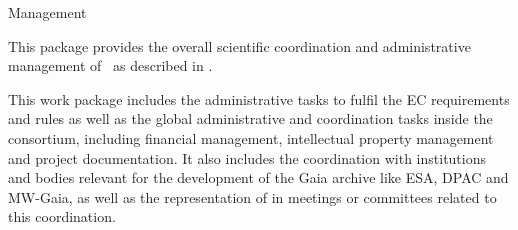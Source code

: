 
\begin{workpackage}{Management}
  \label{wp:management} %

  \wpend{\duration} %


  \makewptable %

  \begin{wpobjectives}
    This package provides the overall scientific coordination and administrative management of \acro\ as described in .
  \end{wpobjectives}

  \begin{wpdescription}

    This work package includes the administrative tasks to fulfil the EC requirements and rules as
    well as the global administrative and coordination tasks inside the consortium, including financial
    management, intellectual property management and project documentation. It also includes the
    coordination with institutions and bodies relevant for the development of the Gaia archive like
    ESA, DPAC and MW-Gaia, as well as the representation of {\acro} in meetings or committees
    related to this coordination.

  \end{wpdescription}
  

\end{workpackage}
